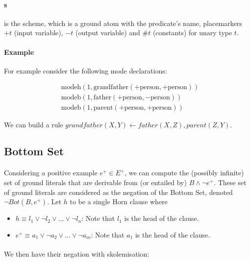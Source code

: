 \documentclass{article}
\theoremstyle{plain}
\theoremstyle{definition}
\begin{document}
\begin{multicols}{2}
\paragraph{s} is the scheme, which is a ground atom with the predicate's name, placemarkers $+t$ (input variable), $-t$ (output variable) and $\#t$ (constants) for unary type $t$. 

\paragraph{Example} For example consider the following mode declarations:

\begin{align*}
	&\text{modeh}(1, \text{grandfather}(+\text{person}, +\text{person}))\\
	&\text{modeb}(1, \text{father}(+\text{person}, -\text{person}))\\
	&\text{modeb}(1, \text{parent}(+\text{person}, +\text{person}))
\end{align*}

We can build a rule $grandfather(X, Y) \leftarrow father(X, Z), parent(Z, Y)$.

\subsection{Bottom Set}

\paragraph{} Considering a positive example $e^+ \in E^+$, we can compute the (possibly infinite) set of ground literals that are derivable from (or entailed by) $B \land \lnot e^+$. These set of ground literals are considered as the negation of the Bottom Set, denoted $\lnot Bot(B, e^+)$. Let $h$ to be a single Horn clause where

\begin{itemize}
\item $h \equiv l_1 \lor \lnot l_2 \lor ... \lor \lnot l_n$: Note that $l_1$ is the head of the clause.
\item $e^+ \equiv a_1 \lor \lnot a_2 \lor ... \lor \lnot a_m$: Note that $a_1$ is the head of the clause.
\end{itemize}

\paragraph{} We then have their negation with skolemisation:


\end{multicols}
\end{document}

